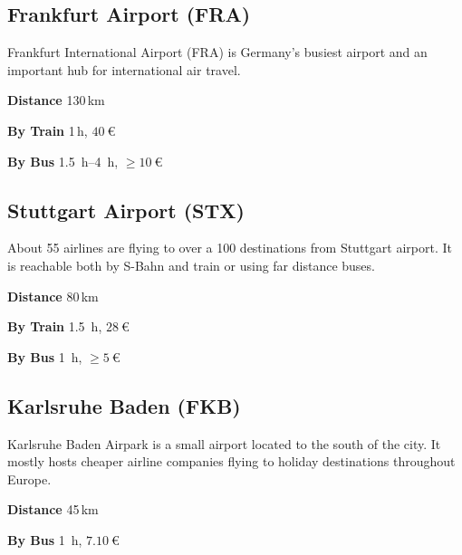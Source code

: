 \begin{multicols}{2}
\raggedcolumns

\subsection{Frankfurt Airport (FRA)}

Frankfurt International Airport (FRA) is Germany's busiest airport and an important hub for
international air travel.
\begin{labeling}{\hspace*{10ex}}
  \item[\bf Distance] 130\,km
  \item[\bf By Train] 1\,h, $\SI{40}{\euro}$
  \item[\bf By Bus] \SI{1.5}{h}–\SI{4}{h}, $\ge\SI{10}{\euro}$
\end{labeling}

\subsection{Stuttgart Airport (STX)}

About 55 airlines are flying to over a 100 destinations from Stuttgart airport.
It is reachable both by S-Bahn and train or using far distance buses.

\begin{labeling}{\hspace*{10ex}}
  \item[\bf Distance] 80\,km
  \item[\bf By Train] \SI{1.5}{\hour}, $\SI{28}{\euro}$
  \item[\bf By Bus] \SI{1}{\hour}, $\ge\SI{5}{\euro}$
\end{labeling}

\subsection{Karlsruhe Baden (FKB)}

Karlsruhe Baden Airpark is a small airport located to the south of the city. It
mostly hosts cheaper airline companies flying to holiday destinations
throughout Europe.

\begin{labeling}{\hspace*{10ex}}
  \item[\bf Distance] 45\,km
  \item[\bf By Bus] \SI{1}{\hour}, $\SI{7.10}{\euro}$
\end{labeling}


\end{multicols}
